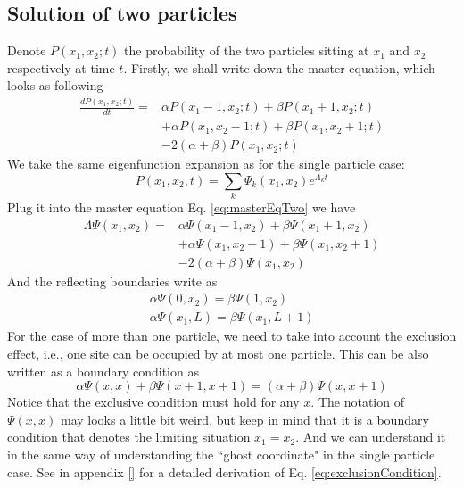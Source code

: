 \subsection{Solution of two particles}
\label{sub:solution_of_two_particles}
Denote $P(x_1,x_2;t)$ the probability of the two particles sitting at $x_1$ and $x_2$ respectively at time $t$. Firstly, we shall write down the master equation, which looks as following
\begin{equation}
    \begin{aligned}
    \label{eq:masterEqTwo}
    \frac{d P(x_1, x_2; t)}{dt} = & \alpha P(x_1-1,x_2;t) + \beta P(x_1+1,x_2;t) \\ 
    & + \alpha P(x_1, x_2-1; t) + \beta P(x_1, x_2+1; t)  \\ 
    & - 2(\alpha+\beta)P(x_1, x_2; t)
    \end{aligned}
\end{equation}
We take the same eigenfunction expansion as for the single particle case:
\begin{equation}
    \label{eq:solutionTwo}
    P(x_1, x_2, t) = \sum_{k} \Psi_{k}(x_1, x_2) e^{\Lambda_k t}
\end{equation}
Plug it into the master equation Eq. \eqref{eq:masterEqTwo} we have
\begin{equation}
    \begin{aligned}
    \label{eq:eigenModesTwo}
    \Lambda \Psi(x_1, x_2) = & \alpha \Psi(x_1-1, x_2) + \beta \Psi(x_1+1, x_2)
    \\ &+ \alpha \Psi(x_1, x_2-1) + \beta \Psi(x_1, x_2+1) \\ 
    &- 2(\alpha+\beta)\Psi(x_1, x_2)
    \end{aligned}
\end{equation}
And the reflecting boundaries write as
\begin{subequations}
    \label{eq:boundaries-two-particles}
    \begin{align}
        \alpha \Psi(0,x_2) = \beta \Psi(1, x_2) \\
        \alpha \Psi(x_1, L) = \beta \Psi(x_1, L+1)
    \end{align}
\end{subequations}
For the case of more than one particle, we need to take into account the exclusion effect, i.e., one site can be occupied by at most one particle. This can be also written as a boundary condition as 
\begin{equation}
    \label{eq:exclusionCondition}
    \alpha \Psi(x, x) + \beta \Psi(x+1, x+1) = (\alpha + \beta) \Psi(x, x+1)
\end{equation}
Notice that the exclusive condition must hold for any $x$. The notation of $\Psi(x, x)$ may looks a little bit weird, but keep in mind that it is a boundary condition that denotes the limiting situation $x_1=x_2$. And we can understand it in the same way of understanding the ``ghost coordinate" in the single particle case. See in appendix \ref{} for a detailed derivation of Eq. \eqref{eq:exclusionCondition}. 

